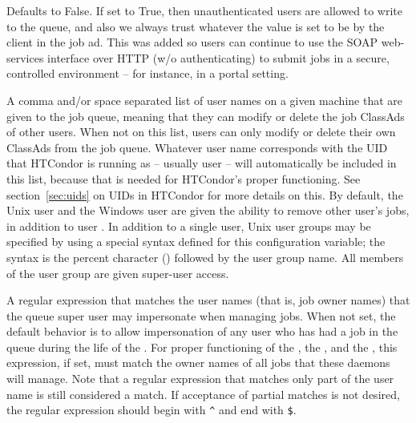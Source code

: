 \begin{description}
\label{param:QueueAllUsersTrusted}
\item[\Macro{QUEUE\_ALL\_USERS\_TRUSTED}]
  Defaults to False. If set to True, then unauthenticated users are allowed
  to write to the queue, and also we always trust whatever the 
  value is set to be by the client in the job ad. This was added so users
  can continue to use the SOAP web-services interface over HTTP (w/o
  authenticating) to submit jobs in a secure, controlled environment -- for
  instance, in a portal setting.
     
\label{param:QueueSuperUsers}
\item[\Macro{QUEUE\_SUPER\_USERS}]
  A comma and/or space separated list of user names on a given machine that
  are given  to the job queue, meaning that they can
  modify or delete the job ClassAds of other users.  When not on this list,
  users can only modify or delete their own ClassAds from the job queue.
  Whatever user name corresponds with the UID that HTCondor is running as --
  usually user  --
  will automatically be included in this list,
  because that is needed for HTCondor's proper functioning.
  See section~\ref{sec:uids} on UIDs in HTCondor for more details on this.
  By default, the Unix user  and the Windows user 
   are given the ability to remove other user's jobs,
  in addition to user .
  In addition to a single user,
  Unix user groups may be specified by using a special syntax
  defined for this configuration variable;
  the syntax is the percent character (\Expr{\%}) followed by the 
  user group name.  
  All members of the user group are given super-user access.

\label{param:QueueSuperUserMayImpersonate}
\item[\Macro{QUEUE\_SUPER\_USER\_MAY\_IMPERSONATE}]
  A regular expression that matches the user names 
  (that is, job owner names) 
  that the queue super user may impersonate when managing jobs.
  When not set, the default behavior is to allow impersonation of any
  user who has had a job in the queue during the life of the .
  For proper functioning of the , the , and
  the , this expression, if set, must match the owner
  names of all jobs that these daemons will manage.  
  Note that a regular expression that matches only part of the user name 
  is still considered a match.  
  If acceptance of partial matches is not desired, 
  the regular expression should begin with \verb|^| and end with \verb|$|.


\end{description}
